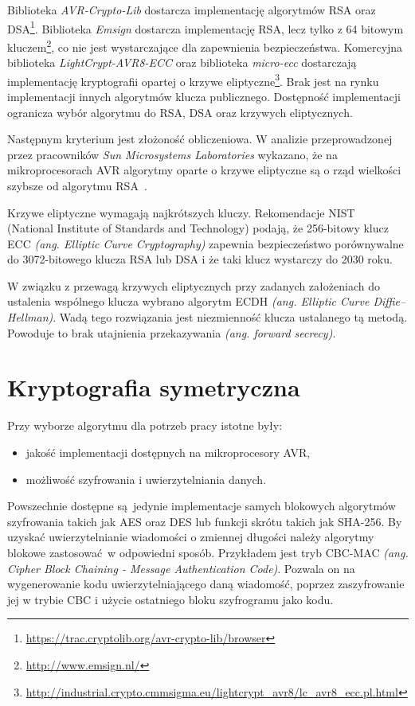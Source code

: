 Biblioteka \emph{AVR-Crypto-Lib} dostarcza implementację algorytmów RSA oraz DSA\footnote{\url{https://trac.cryptolib.org/avr-crypto-lib/browser}}. Biblioteka \emph{Emsign} dostarcza implementację RSA, lecz tylko z 64 bitowym kluczem\footnote{\url{http://www.emsign.nl/}}, co nie jest wystarczające dla zapewnienia bezpieczeństwa. Komercyjna biblioteka \emph{LightCrypt-AVR8-ECC} oraz biblioteka \emph{micro-ecc} dostarczają implementację kryptografii opartej o krzywe eliptyczne\footnote{\url{http://industrial.crypto.cmmsigma.eu/lightcrypt_avr8/lc_avr8_ecc.pl.html}}. Brak jest na rynku implementacji innych algorytmów klucza publicznego. Dostępność implementacji ogranicza wybór algorytmu do RSA, DSA oraz krzywych eliptycznych.

Następnym kryterium jest złożoność obliczeniowa. W analizie przeprowadzonej przez pracowników \emph{Sun Microsystems Laboratories} wykazano, że na mikroprocesorach AVR algorytmy oparte o krzywe eliptyczne są o rząd wielkości szybsze od algorytmu RSA~\cite{Gura2004}.

Krzywe eliptyczne wymagają najkrótszych kluczy. Rekomendacje NIST~\cite{Nist} (National Institute of Standards and Technology) podają, że 256-bitowy klucz ECC \emph{(ang. Elliptic Curve Cryptography)} zapewnia bezpieczeństwo porównywalne do 3072-bitowego klucza RSA lub DSA i że taki klucz wystarczy do 2030 roku.

W związku z przewagą krzywych eliptycznych przy zadanych założeniach do ustalenia wspólnego klucza wybrano algorytm ECDH \emph{(ang. Elliptic Curve Diffie--Hellman)}. Wadą tego rozwiązania jest niezmienność klucza ustalanego tą metodą. Powoduje to brak utajnienia przekazywania \emph{(ang. forward secrecy)}.

\section{Kryptografia symetryczna}
\label{sec:kryptoSym}

Przy wyborze algorytmu dla potrzeb pracy istotne były:

\begin{itemize}
\item jakość implementacji dostępnych na mikroprocesory AVR,
\item możliwość szyfrowania i uwierzytelniania danych.
\end{itemize}

Powszechnie dostępne są jedynie implementacje samych blokowych algorytmów szyfrowania takich jak AES oraz DES lub funkcji skrótu takich jak SHA-256. By uzyskać uwierzytelnianie wiadomości o zmiennej długości należy algorytmy blokowe zastosować w odpowiedni sposób. Przykładem jest tryb CBC-MAC {\itshape (ang. Cipher Block Chaining - Message Authentication Code)}. Pozwala on na wygenerowanie kodu uwierzytelniającego daną wiadomość, poprzez zaszyfrowanie jej w trybie CBC i użycie ostatniego bloku szyfrogramu jako kodu.


